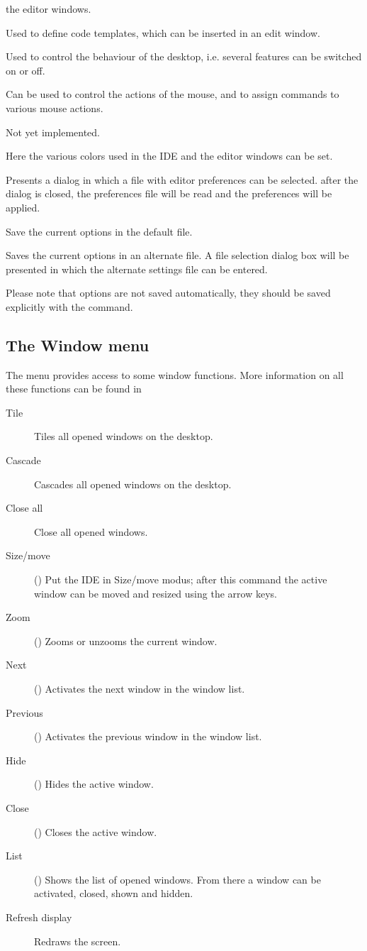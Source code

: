 \begin{description}
\begin{description}
the editor windows.
\item[Codetemplates]
Used to define code templates, which can be inserted in an edit window.
\item[Desktop]
Used to control the behaviour of the desktop, i.e. several features can be
switched on or off.
\item[Mouse]
Can be used to control the actions of the mouse, and to assign commands to
various mouse actions.
\item[Startup]
Not yet implemented.
\item[Colors]
Here the various colors used in the IDE and the editor windows can be set.
\end{description}
\item[Open]
Presents a dialog in which a file with editor preferences can be selected. 
after the dialog is closed, the preferences file will be read and the
preferences will be applied.
\item[Save]
Save the current options in the default file.
\item[Save as]
Saves the current options in an alternate file. A file selection dialog box
will be presented in which the alternate settings file can be entered.
\end{description}
Please note that options are not saved automatically, they should be saved
explicitly with the  command.
%
%
\subsection{The Window menu}
\label{se:menuwindow}
The  menu provides access to some window functions. More information
on all these functions can be found in 
\begin{description}
\item[Tile]
Tiles all opened windows on the desktop.
\item[Cascade]
Cascades all opened windows on the desktop.
\item[Close all]
Close all opened windows.
\item[Size/move] ()
Put the IDE in Size/move modus; after this command the active window can be
moved and resized using the arrow keys.
\item[Zoom] ()
Zooms or unzooms the current window. 
\item[Next] ()
Activates the next window in the window list.
\item[Previous] ()
Activates the previous window in the window list.
\item[Hide] ()
Hides the active window. 
\item[Close] ()
Closes the active window.
\item[List] ()
Shows the list of opened windows. From there a
window can be activated, closed, shown and hidden.
\item[Refresh display]
Redraws the screen.
\end{description}
%
%

